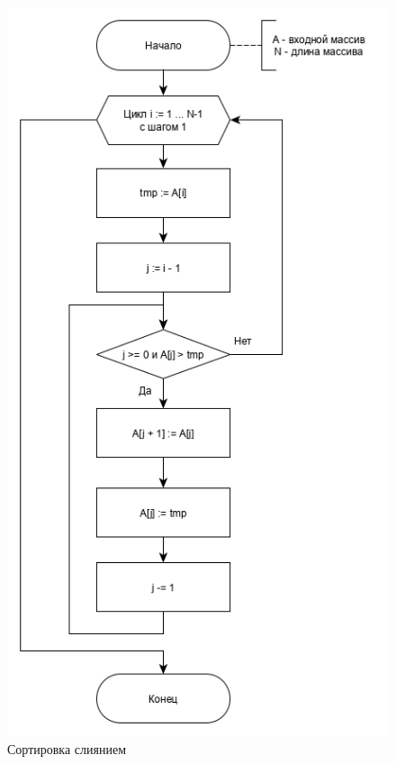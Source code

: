 \documentclass[12pt, a4paper]{report}
\begin{document}
	\begin{figure}[ht!]
		\centering
		\includegraphics[scale=0.8]{insert.png}
		\caption{Сортировка слиянием}
		\label{pic:merge}
	\end{figure}
	\newpage
\end{document}

